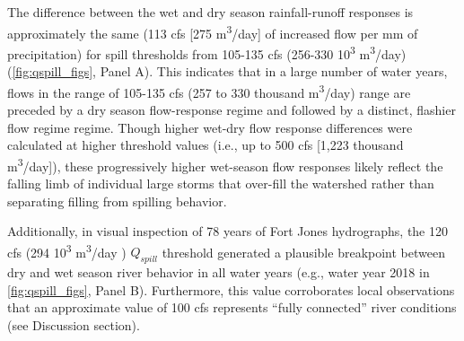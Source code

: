\documentclass[hess, manuscript]{copernicus}
\begin{document}
The difference between the wet and dry season rainfall-runoff responses
is approximately the same (113 cfs {[}275 m\textsuperscript{3}/day{]} of
increased flow per mm of precipitation) for spill thresholds from
105-135 cfs (256-330 10\textsuperscript{3} m\textsuperscript{3}/day)
(\autoref{fig:qspill_figs}, Panel A). This indicates that in a large
number of water years, flows in the range of 105-135 cfs (257 to 330
thousand m\textsuperscript{3}/day) range are preceded by a dry season
flow-response regime and followed by a distinct, flashier flow regime
regime. Though higher wet-dry flow response differences were calculated
at higher threshold values (i.e., up to 500 cfs {[}1,223 thousand
m\textsuperscript{3}/day{]}), these progressively higher wet-season flow
responses likely reflect the falling limb of individual large storms
that over-fill the watershed rather than separating filling from
spilling behavior.

Additionally, in visual inspection of 78 years of Fort Jones
hydrographs, the 120 cfs (294 10\textsuperscript{3}
m\textsuperscript{3}/day ) \(Q_{spill}\) threshold generated a plausible
breakpoint between dry and wet season river behavior in all water years
(e.g., water year 2018 in \autoref{fig:qspill_figs}, Panel B).
Furthermore, this value corroborates local observations that an
approximate value of 100 cfs represents ``fully connected'' river
conditions (see Discussion section).
\end{document}
